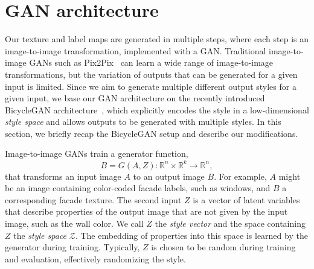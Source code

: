 \section{GAN architecture}
\label{sec:gan_architecture}

Our texture and label maps are generated in multiple steps, where each step is an image-to-image transformation, implemented with a GAN. Traditional image-to-image GANs such as Pix2Pix~\cite{pix2pix} can learn a wide range of image-to-image transformations, but the variation of outputs that can be generated for a given input is limited. Since we aim to generate multiple different output styles for a given input, we base our GAN architecture on the recently introduced BicycleGAN architecture~\cite{zhu2017multimodal}, which explicitly encodes the style in a low-dimensional \emph{style space} and allows outputs to be generated with multiple styles. In this section, we briefly recap the BicycleGAN setup and describe our modifications.

Image-to-image GANs train a generator function,
%
\begin{equation}
\label{eq:gan_function}
B = G(A,Z): \mathbb{R}^n \times \mathbb{R}^k \rightarrow \mathbb{R}^n,    
\end{equation}
%
that transforms an input image $A$ to an output image $B$. For example, $A$ might be an image containing color-coded facade labels, such as windows, and $B$ a corresponding facade texture. The second input $Z$ is a vector of latent variables that describe properties of the output image that are not given by the input image, such as the wall color. We call $Z$ the \emph{style vector} and the space containing $Z$ the \emph{style space} $\mathcal{Z}$. The embedding of properties into this space is learned by the generator during training. Typically, $Z$ is chosen to be random during training and evaluation, effectively randomizing the style.

